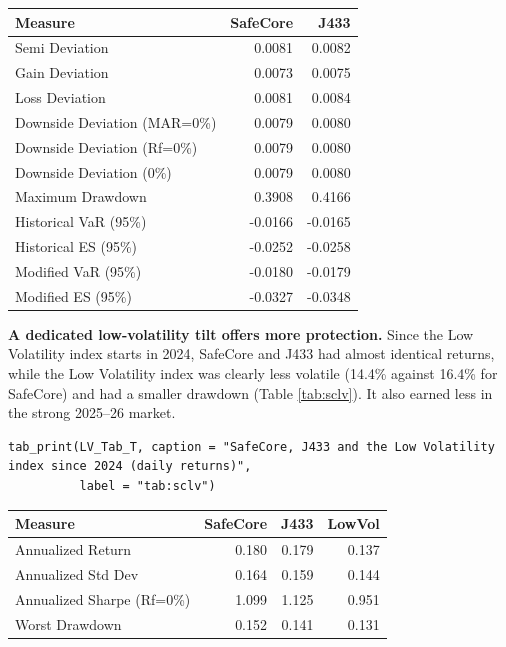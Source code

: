 \documentclass[11pt,preprint]{elsarticle}
\let\origtable\table
\let\endorigtable\endtable
\renewenvironment{table}[1][2] {
    \expandafter\origtable\expandafter[H]
} {
    \endorigtable
}
\numberwithin{equation}{section}
\numberwithin{figure}{section}
\numberwithin{table}{section}
\begin{document}
\begin{table}[!htbp]
\centering
\caption{Downside risk on daily returns} 
\label{tab:scdr}
\begingroup\footnotesize
\begin{tabular}{lrr}
  \hline
Measure & SafeCore & J433 \\ 
  \hline
Semi Deviation & 0.0081 & 0.0082 \\ 
  Gain Deviation & 0.0073 & 0.0075 \\ 
  Loss Deviation & 0.0081 & 0.0084 \\ 
  Downside Deviation (MAR=0\%) & 0.0079 & 0.0080 \\ 
  Downside Deviation (Rf=0\%) & 0.0079 & 0.0080 \\ 
  Downside Deviation (0\%) & 0.0079 & 0.0080 \\ 
  Maximum Drawdown & 0.3908 & 0.4166 \\ 
  Historical VaR (95\%) & -0.0166 & -0.0165 \\ 
  Historical ES (95\%) & -0.0252 & -0.0258 \\ 
  Modified VaR (95\%) & -0.0180 & -0.0179 \\ 
  Modified ES (95\%) & -0.0327 & -0.0348 \\ 
   \hline
\end{tabular}
\endgroup
\end{table}

\textbf{A dedicated low-volatility tilt offers more protection.} Since
the Low Volatility index starts in 2024, SafeCore and J433 had almost
identical returns, while the Low Volatility index was clearly less
volatile (14.4\% against 16.4\% for SafeCore) and had a smaller drawdown
(Table \ref{tab:sclv}). It also earned less in the strong 2025--26
market.

\begin{verbatim}
tab_print(LV_Tab_T, caption = "SafeCore, J433 and the Low Volatility index since 2024 (daily returns)",
          label = "tab:sclv")
\end{verbatim}

\begin{table}[!htbp]
\centering
\caption{SafeCore, J433 and the Low Volatility index since 2024 (daily returns)} 
\label{tab:sclv}
\begingroup\footnotesize
\begin{tabular}{lrrr}
  \hline
Measure & SafeCore & J433 & LowVol \\ 
  \hline
Annualized Return & 0.180 & 0.179 & 0.137 \\ 
  Annualized Std Dev & 0.164 & 0.159 & 0.144 \\ 
  Annualized Sharpe (Rf=0\%) & 1.099 & 1.125 & 0.951 \\ 
  Worst Drawdown & 0.152 & 0.141 & 0.131 \\ 
   \hline
\end{tabular}
\endgroup
\end{table}
\end{document}
